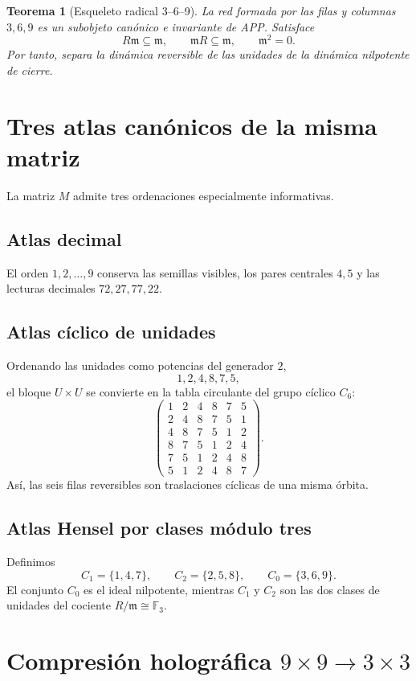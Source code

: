 \documentclass[11pt,a4paper]{article}
\newtheorem{teorema}{Teorema}
\newcommand{\F}{\mathbb F}
\begin{document}
\begin{teorema}[Esqueleto radical 3--6--9]
La red formada por las filas y columnas $3,6,9$ es un subobjeto canónico e invariante de APP. Satisface
\[
R\mathfrak m\subseteq\mathfrak m,
\qquad
\mathfrak m R\subseteq\mathfrak m,
\qquad
\mathfrak m^2=0.
\]
Por tanto, separa la dinámica reversible de las unidades de la dinámica nilpotente de cierre.
\end{teorema}

\section{Tres atlas canónicos de la misma matriz}

La matriz $M$ admite tres ordenaciones especialmente informativas.

\subsection*{Atlas decimal}
El orden $1,2,\dots,9$ conserva las semillas visibles, los pares centrales $4,5$ y las lecturas decimales $72,27,77,22$.

\subsection*{Atlas cíclico de unidades}
Ordenando las unidades como potencias del generador $2$,
\[
1,2,4,8,7,5,
\]
el bloque $U\times U$ se convierte en la tabla circulante del grupo cíclico $C_6$:
\[
\begin{pmatrix}
1&2&4&8&7&5\\
2&4&8&7&5&1\\
4&8&7&5&1&2\\
8&7&5&1&2&4\\
7&5&1&2&4&8\\
5&1&2&4&8&7
\end{pmatrix}.
\]
Así, las seis filas reversibles son traslaciones cíclicas de una misma órbita.

\subsection*{Atlas Hensel por clases módulo tres}
Definimos
\[
C_1=\{1,4,7\},\qquad
C_2=\{2,5,8\},\qquad
C_0=\{3,6,9\}.
\]
El conjunto $C_0$ es el ideal nilpotente, mientras $C_1$ y $C_2$ son las dos clases de unidades del cociente $R/\mathfrak m\cong\F_3$.

\section{Compresión holográfica $9\times9\to3\times3$}
\end{document}
